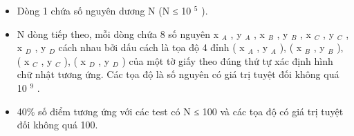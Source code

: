 \begin{itemize}
	\item     Dòng 1 chứa số nguyên dương N (N ≤ 10    $^     5    $    ).   
	\item     N dòng tiếp theo, mỗi dòng chứa 8 số nguyên x    $_     A    $    , y    $_     A    $    , x    $_     B    $    , y    $_     B    $    , x    $_     C    $    , y    $_     C    $    , x    $_     D    $    , y    $_     D    $    cách nhau bởi dấu cách là tọa độ 4 đỉnh (         x    $_     A    $     , y     $_      A     $     ), (           x     $_      B     $      , y     $_      B     $     ), (           x     $_      C     $      , y     $_      C     $     ), (           x     $_      D     $      , y     $_      D     $     ) của một tờ giấy theo đúng thứ tự xác định hình chữ nhật tương ứng. Các tọa độ là số nguyên có giá trị tuyệt đối không quá 10     $^      9     $     .    
	\item      40\% số điểm tương ứng với các test có N         ≤ 100 và các tọa độ có giá trị tuyệt đối không quá 100.    
\end{itemize}

\